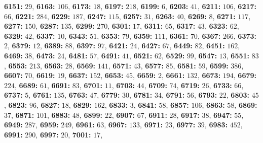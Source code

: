 \textsf{\bfseries 6151:} $29$, \textsf{\bfseries 6163:} $106$, \textsf{\bfseries 6173:} $18$, \textsf{\bfseries 6197:} $218$, \textsf{\bfseries 6199:} $6$, \textsf{\bfseries 6203:} $41$, \textsf{\bfseries 6211:} $106$, \textsf{\bfseries 6217:} $66$, \textsf{\bfseries 6221:} $284$, \textsf{\bfseries 6229:} $187$, \textsf{\bfseries 6247:} $115$, \textsf{\bfseries 6257:} $31$, \textsf{\bfseries 6263:} $40$, \textsf{\bfseries 6269:} $8$, \textsf{\bfseries 6271:} $117$, \textsf{\bfseries 6277:} $150$, \textsf{\bfseries 6287:} $135$, \textsf{\bfseries 6299:} $270$, \textsf{\bfseries 6301:} $17$, \textsf{\bfseries 6311:} $65$, \textsf{\bfseries 6317:} $43$, \textsf{\bfseries 6323:} $62$, \textsf{\bfseries 6329:} $42$, \textsf{\bfseries 6337:} $10$, \textsf{\bfseries 6343:} $51$, \textsf{\bfseries 6353:} $79$, \textsf{\bfseries 6359:} $111$, \textsf{\bfseries 6361:} $70$, \textsf{\bfseries 6367:} $266$, \textsf{\bfseries 6373:} $2$, \textsf{\bfseries 6379:} $12$, \textsf{\bfseries 6389:} $88$, \textsf{\bfseries 6397:} $97$, \textsf{\bfseries 6421:} $24$, \textsf{\bfseries 6427:} $67$, \textsf{\bfseries 6449:} $82$, \textsf{\bfseries 6451:} $162$, \textsf{\bfseries 6469:} $38$, \textsf{\bfseries 6473:} $24$, \textsf{\bfseries 6481:} $57$, \textsf{\bfseries 6491:} $41$, \textsf{\bfseries 6521:} $62$, \textsf{\bfseries 6529:} $99$, \textsf{\bfseries 6547:} $13$, \textsf{\bfseries 6551:} $83$, \textsf{\bfseries 6553:} $213$, \textsf{\bfseries 6563:} $28$, \textsf{\bfseries 6569:} $141$, \textsf{\bfseries 6571:} $43$, \textsf{\bfseries 6577:} $85$, \textsf{\bfseries 6581:} $59$, \textsf{\bfseries 6599:} $386$, \textsf{\bfseries 6607:} $70$, \textsf{\bfseries 6619:} $19$, \textsf{\bfseries 6637:} $152$, \textsf{\bfseries 6653:} $45$, \textsf{\bfseries 6659:} $2$, \textsf{\bfseries 6661:} $132$, \textsf{\bfseries 6673:} $194$, \textsf{\bfseries 6679:} $224$, \textsf{\bfseries 6689:} $61$, \textsf{\bfseries 6691:} $83$, \textsf{\bfseries 6701:} $11$, \textsf{\bfseries 6703:} $44$, \textsf{\bfseries 6709:} $74$, \textsf{\bfseries 6719:} $26$, \textsf{\bfseries 6733:} $66$, \textsf{\bfseries 6737:} $5$, \textsf{\bfseries 6761:} $135$, \textsf{\bfseries 6763:} $47$, \textsf{\bfseries 6779:} $30$, \textsf{\bfseries 6781:} $34$, \textsf{\bfseries 6791:} $56$, \textsf{\bfseries 6793:} $22$, \textsf{\bfseries 6803:} $45$, \textsf{\bfseries 6823:} $96$, \textsf{\bfseries 6827:} $18$, \textsf{\bfseries 6829:} $162$, \textsf{\bfseries 6833:} $3$, \textsf{\bfseries 6841:} $58$, \textsf{\bfseries 6857:} $106$, \textsf{\bfseries 6863:} $58$, \textsf{\bfseries 6869:} $37$, \textsf{\bfseries 6871:} $101$, \textsf{\bfseries 6883:} $48$, \textsf{\bfseries 6899:} $22$, \textsf{\bfseries 6907:} $67$, \textsf{\bfseries 6911:} $28$, \textsf{\bfseries 6917:} $38$, \textsf{\bfseries 6947:} $55$, \textsf{\bfseries 6949:} $287$, \textsf{\bfseries 6959:} $249$, \textsf{\bfseries 6961:} $63$, \textsf{\bfseries 6967:} $133$, \textsf{\bfseries 6971:} $23$, \textsf{\bfseries 6977:} $39$, \textsf{\bfseries 6983:} $452$, \textsf{\bfseries 6991:} $290$, \textsf{\bfseries 6997:} $20$, \textsf{\bfseries 7001:} $17$, 
